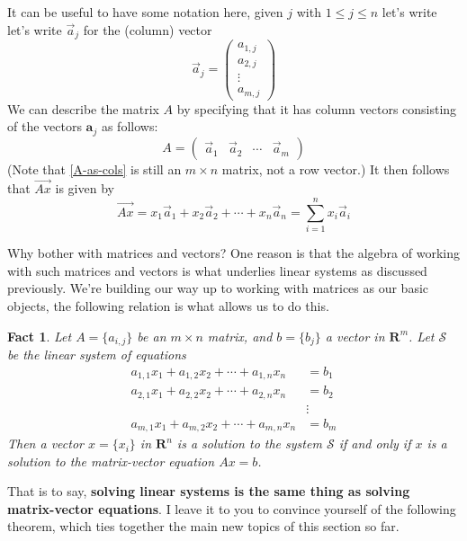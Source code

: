 \documentclass[12pt]{article}
\numberwithin{equation}{subsection}
\numberwithin{figure}{subsection}
\newtheorem{fact}[subsection]{Fact}
\theoremstyle{note}
\begin{document}
It can be useful to have some notation here, given $j$ with $1\leq j \leq n$ let's write let's write $\vec{a}_j$ for the (column) vector \[ \vec{a}_j=\begin{pmatrix} a_{1,j} \\ a_{2,j} \\ \vdots \\ a_{m, j} \end{pmatrix}\] We can describe the matrix $A$ by specifying that it has column vectors consisting of the vectors $\mathbf{a}_j$ as follows: \begin{equation} \label{A-as-cols} A= \begin{pmatrix} \vec{a}_1 & \vec{a}_2 & \cdots & \vec{a}_m\end{pmatrix} \end{equation}
(Note that \eqref{A-as-cols} is still an $m\times n$ matrix, not a row vector.) It then follows that $\vec{Ax}$ is given by \[ \vec{Ax}=x_1 \vec{a}_1+x_2 \vec{a}_2 +\cdots +x_n\vec{a}_n=\sum_{i=1}^n x_i\vec{a}_i\]

Why bother with matrices and vectors? One reason is that the algebra of working with such matrices and vectors is what underlies linear systems as discussed previously. We're building our way up to working with matrices as our basic objects, the following relation is what allows us to do this. 

\begin{fact} \label{fact-linear-sys-vec}
Let $A=\{a_{i,j}\}$ be an $m\times n$ matrix, and ${b}=\{b_j\}$ a vector in $\mathbf{R}^m$. Let $\mathcal{S}$ be the linear system of equations \begin{align*} 
a_{1,1}x_1+a_{1,2}x_2+\cdots + a_{1,n}x_n&=b_1 \nonumber \\
a_{2,1}x_1+a_{2,2}x_2+\cdots + a_{2,n}x_n&=b_2 \nonumber \\ 
 &\vdots \nonumber  \\
a_{m,1}x_1+a_{m,2}x_2+\cdots + a_{m,n}x_n&=b_m \end{align*}
Then a vector ${x}=\{x_i\}$ in $\mathbf{R}^n$ is a solution to the system $\mathcal{S}$ if and only if ${x}$ is a solution to the matrix-vector equation ${Ax}={b}$.
\end{fact}	

That is to say, \textbf{solving linear systems is the same thing as solving matrix-vector equations}. %
I leave it to you to convince yourself of the following theorem, which ties together the main new topics of this section so far.
\end{document}
